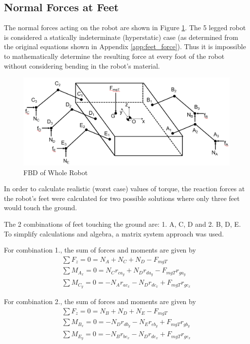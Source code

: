 \subsection{Normal Forces at Feet}
\label{sec:normal_forces}

The normal forces acting on the robot are shown in Figure \ref{fig:robot_ext_fbd}. The 5 legged robot is considered a statically indeterminate (hyperstatic) case (as determined from the original equations shown in Appendix \ref{app:feet_force}). Thus it is impossible to mathematically determine the resulting force at every foot of the robot without considering bending in the robot's material. 

\begin{figure}[H]
    \centering
    \includegraphics[width=\textwidth]{4_ComponentProperties/img/robot_ext_fbd.PNG}
    \caption{FBD of Whole Robot}
    \label{fig:robot_ext_fbd}
\end{figure}

In order to calculate realistic (worst case) values of torque, the reaction forces at the robot's feet were calculated for two possible solutions where only three feet would touch the ground. 

The 2 combinations of feet touching the ground are: 1. A, C, D and 2. B, D, E. To simplify calculations and algebra, a matrix system approach was used. 

For combination 1., the sum of forces and moments are given by
\begin{gather}
    \sum F_z = 0 = N_A + N_C + N_D - F_{mgT}
    \\
    \sum M_{A_x} = 0 = N_C r_{ca_y} + N_D r_{da_y} - F_{mgT} r_{ga_y}
    \\
    \sum M_{C_y} = 0 = -N_A r_{ac_x} -N_D r_{dc_x} + F_{mgT} r_{gc_x}
\end{gather}

For combination 2., the sum of forces and moments are given by
\begin{gather}
    \sum F_z = 0 = N_B + N_D + N_E - F_{mgT}
    \\
    \sum M_{B_x} = 0 = -N_D r_{db_y} - N_E r_{eb_y} + F_{mgT} r_{gb_y}
    \\
    \sum M_{E_y} = 0 = -N_B r_{be_x} -N_D r_{de_x} + F_{mgT} r_{ge_x}
\end{gather}


